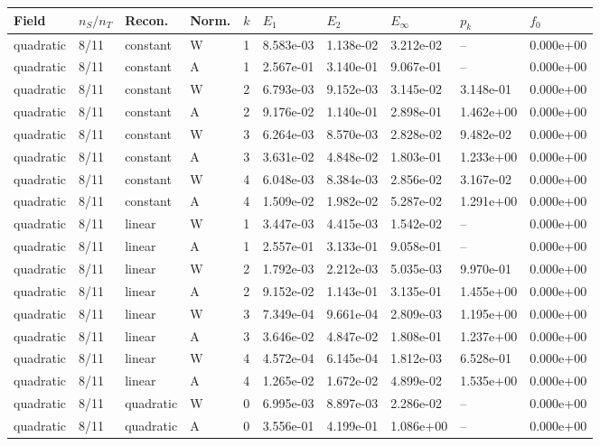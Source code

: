 \begin{tabular}{llllllllll}
\toprule
Field & $n_S/n_T$ & Recon. & Norm. & $k$ & $E_1$ & $E_2$ & $E_\infty$ & $p_k$ & $f_0$ \\
\midrule
quadratic & 8/11 & constant & W & 1 & 8.583e-03 & 1.138e-02 & 3.212e-02 & -- & 0.000e+00 \\
quadratic & 8/11 & constant & A & 1 & 2.567e-01 & 3.140e-01 & 9.067e-01 & -- & 0.000e+00 \\
quadratic & 8/11 & constant & W & 2 & 6.793e-03 & 9.152e-03 & 3.145e-02 & 3.148e-01 & 0.000e+00 \\
quadratic & 8/11 & constant & A & 2 & 9.176e-02 & 1.140e-01 & 2.898e-01 & 1.462e+00 & 0.000e+00 \\
quadratic & 8/11 & constant & W & 3 & 6.264e-03 & 8.570e-03 & 2.828e-02 & 9.482e-02 & 0.000e+00 \\
quadratic & 8/11 & constant & A & 3 & 3.631e-02 & 4.848e-02 & 1.803e-01 & 1.233e+00 & 0.000e+00 \\
quadratic & 8/11 & constant & W & 4 & 6.048e-03 & 8.384e-03 & 2.856e-02 & 3.167e-02 & 0.000e+00 \\
quadratic & 8/11 & constant & A & 4 & 1.509e-02 & 1.982e-02 & 5.287e-02 & 1.291e+00 & 0.000e+00 \\
quadratic & 8/11 & linear & W & 1 & 3.447e-03 & 4.415e-03 & 1.542e-02 & -- & 0.000e+00 \\
quadratic & 8/11 & linear & A & 1 & 2.557e-01 & 3.133e-01 & 9.058e-01 & -- & 0.000e+00 \\
quadratic & 8/11 & linear & W & 2 & 1.792e-03 & 2.212e-03 & 5.035e-03 & 9.970e-01 & 0.000e+00 \\
quadratic & 8/11 & linear & A & 2 & 9.152e-02 & 1.143e-01 & 3.135e-01 & 1.455e+00 & 0.000e+00 \\
quadratic & 8/11 & linear & W & 3 & 7.349e-04 & 9.661e-04 & 2.809e-03 & 1.195e+00 & 0.000e+00 \\
quadratic & 8/11 & linear & A & 3 & 3.646e-02 & 4.847e-02 & 1.808e-01 & 1.237e+00 & 0.000e+00 \\
quadratic & 8/11 & linear & W & 4 & 4.572e-04 & 6.145e-04 & 1.812e-03 & 6.528e-01 & 0.000e+00 \\
quadratic & 8/11 & linear & A & 4 & 1.265e-02 & 1.672e-02 & 4.899e-02 & 1.535e+00 & 0.000e+00 \\
quadratic & 8/11 & quadratic & W & 0 & 6.995e-03 & 8.897e-03 & 2.286e-02 & -- & 0.000e+00 \\
quadratic & 8/11 & quadratic & A & 0 & 3.556e-01 & 4.199e-01 & 1.086e+00 & -- & 0.000e+00 \\

\end{tabular}
